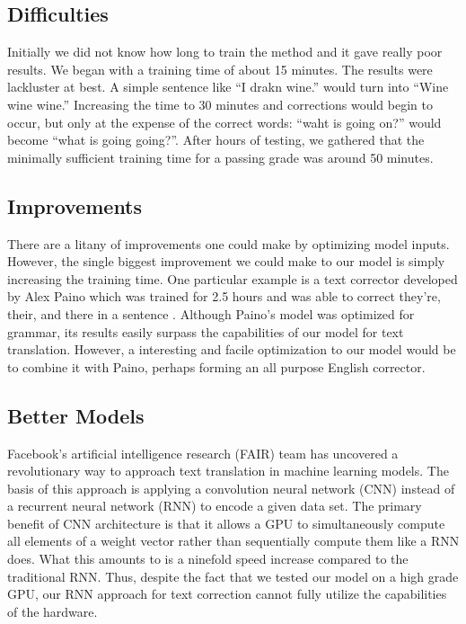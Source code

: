 \documentclass[11pt,a4paper]{scrartcl}
\theoremstyle{definition}
\begin{document}
\subsection{Difficulties}
Initially we did not know how long to train the method and it gave really poor results. We began with a training time of about 15 minutes. The results were lackluster at best. A simple sentence like “I drakn wine.” would turn into “Wine wine wine.” Increasing the time to 30 minutes and corrections would begin to occur, but only at the expense of the correct words: “waht is going on?” would become “what is going going?”. After hours of testing, we gathered that the minimally sufficient training time for a passing grade was around 50 minutes. 
\subsection{Improvements}
There are a litany of improvements one could make by optimizing model inputs. However, the single biggest improvement we could make to our model is simply increasing the training time. One particular example is a text corrector developed by Alex Paino which was trained for 2.5 hours and was able to correct they're, their, and there in a sentence \cite{Floyd}. Although Paino's model was optimized for grammar, its results easily surpass the capabilities of our model for text translation. However, a interesting and facile optimization to our model would be to combine it with Paino, perhaps forming an all purpose English corrector.
\subsection{Better Models}
Facebook’s artificial intelligence research (FAIR) team has uncovered a revolutionary way to approach text translation in machine learning models. The basis of this approach is applying a convolution neural network (CNN) instead of a recurrent neural network (RNN) to encode a given data set. The primary benefit of CNN architecture is that it allows a GPU to simultaneously compute all elements of a weight vector rather than sequentially compute them like a RNN does. What this amounts to is a ninefold speed increase compared to the traditional RNN. Thus, despite the fact that we tested our model on a high grade GPU, our RNN approach for text correction cannot fully utilize the capabilities of the hardware. \newline
\end{document}
